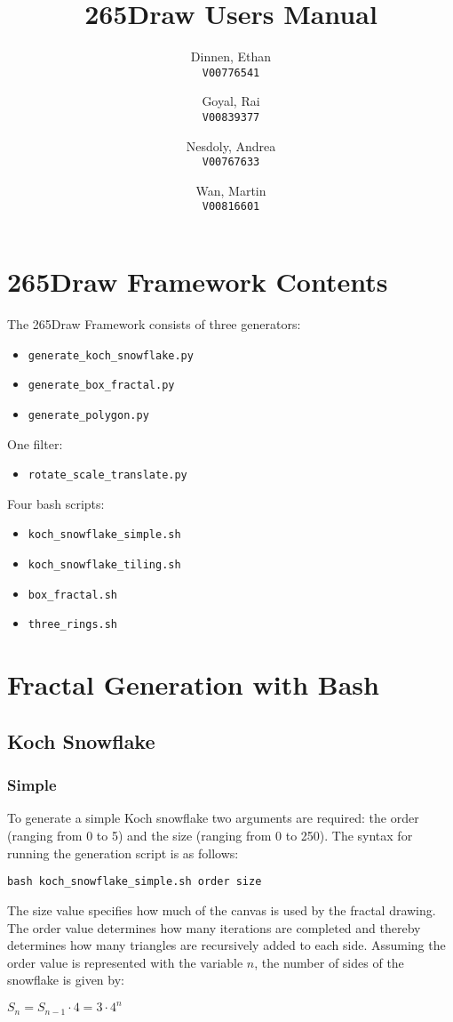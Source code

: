 \documentclass{article}
\title{265Draw Users Manual}
\date{}
\author{
  Dinnen, Ethan\\
  \texttt{V00776541}
  \and
  Goyal, Rai\\
  \texttt{V00839377}
  \and
  Nesdoly, Andrea\\
  \texttt{V00767633}
  \and
  Wan, Martin\\
  \texttt{V00816601}
}
\begin{document}
  \maketitle
  \section*{265Draw Framework Contents}
  The 265Draw Framework consists of three generators:
  \begin{itemize}
    \item \texttt{generate\_koch\_snowflake.py}
    \item \texttt{generate\_box\_fractal.py}
    \item \texttt{generate\_polygon.py}
  \end{itemize}
  One filter:
  \begin{itemize}
    \item \texttt{rotate\_scale\_translate.py}
  \end{itemize}
  Four bash scripts:
  \begin{itemize}
    \item \texttt{koch\_snowflake\_simple.sh}
    \item \texttt{koch\_snowflake\_tiling.sh}
    \item \texttt{box\_fractal.sh}
    \item \texttt{three\_rings.sh}
  \end{itemize}
  \section*{Fractal Generation with Bash}
    \subsection*{Koch Snowflake}
      \subsubsection*{Simple}
        To generate a simple Koch snowflake two arguments are required: the order (ranging from 0 to 5) and the size (ranging from 0 to 250). The syntax for running the generation script is as follows:
        \begin{center}
          \texttt{bash koch\_snowflake\_simple.sh order size}
        \end{center}
        The size value specifies how much of the canvas is used by the fractal drawing. The order value determines how many iterations are completed and thereby determines how many triangles are recursively added to each side. Assuming the order value is represented with the variable $n$, the number of sides of the snowflake is given by:
      \begin{center}
        $S_n = S_{n-1}\cdot 4 = 3\cdot 4^n$
      \end{center}
\end{document}
